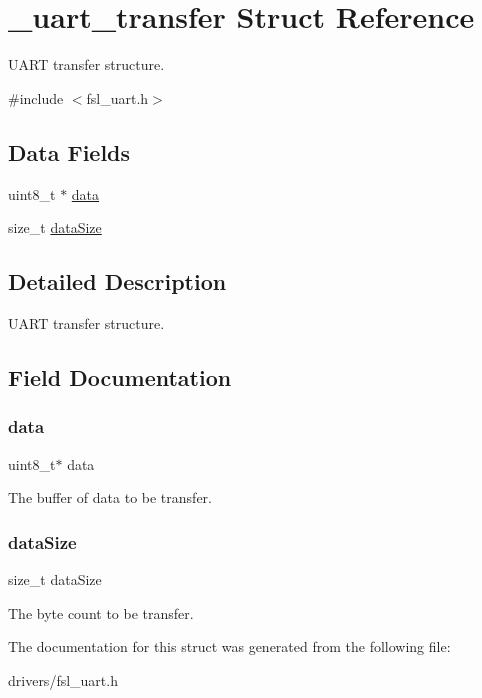 \hypertarget{struct__uart__transfer}{}\section{\+\_\+uart\+\_\+transfer Struct Reference}
\label{struct__uart__transfer}


U\+A\+RT transfer structure.  




{\ttfamily \#include $<$fsl\+\_\+uart.\+h$>$}

\subsection*{Data Fields}
\begin{DoxyCompactItemize}
\item 
uint8\+\_\+t $\ast$ \mbox{\hyperlink{struct__uart__transfer_abe222f6d3581e7920dcad5306cc906a8}{data}}
\item 
size\+\_\+t \mbox{\hyperlink{struct__uart__transfer_a78f9703861dd365a513c2c5aab9f9239}{data\+Size}}
\end{DoxyCompactItemize}


\subsection{Detailed Description}
U\+A\+RT transfer structure. 

\subsection{Field Documentation}
\mbox{\label{struct__uart__transfer_abe222f6d3581e7920dcad5306cc906a8}} 
\subsubsection{\texorpdfstring{data}{data}}
{\footnotesize\ttfamily uint8\+\_\+t$\ast$ data}

The buffer of data to be transfer. \mbox{\label{struct__uart__transfer_a78f9703861dd365a513c2c5aab9f9239}} 
\subsubsection{\texorpdfstring{dataSize}{dataSize}}
{\footnotesize\ttfamily size\+\_\+t data\+Size}

The byte count to be transfer. 

The documentation for this struct was generated from the following file\+:\begin{DoxyCompactItemize}
\item 
drivers/fsl\+\_\+uart.\+h\end{DoxyCompactItemize}
